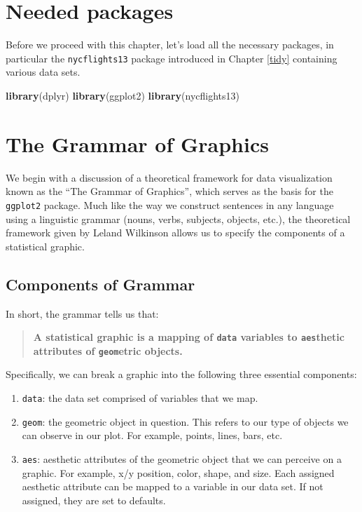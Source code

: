 \documentclass[]{tufte-book}
\newenvironment{Shaded}{\begin{snugshade}}{\end{snugshade}}
\newcommand{\KeywordTok}[1]{\textcolor[rgb]{0.13,0.29,0.53}{\textbf{{#1}}}}
\newcommand{\NormalTok}[1]{{#1}}
\providecommand{\tightlist}{%
  \setlength{\itemsep}{0pt}\setlength{\parskip}{0pt}}
\begin{document}
\section*{Needed packages}\label{needed-packages}

Before we proceed with this chapter, let's load all the necessary
packages, in particular the \texttt{nycflights13} package introduced in
Chapter \ref{tidy} containing various data sets.

\begin{Shaded}
\begin{Highlighting}[]
\KeywordTok{library}\NormalTok{(dplyr)}
\KeywordTok{library}\NormalTok{(ggplot2)}
\KeywordTok{library}\NormalTok{(nycflights13)}
\end{Highlighting}
\end{Shaded}

\section{The Grammar of Graphics}\label{grammarofgraphics}

We begin with a discussion of a theoretical framework for data
visualization known as the ``The Grammar of Graphics'', which serves as
the basis for the \texttt{ggplot2} package. Much like the way we
construct sentences in any language using a linguistic grammar (nouns,
verbs, subjects, objects, etc.), the theoretical framework given by
Leland Wilkinson \citep{wilkinson2005} allows us to specify the
components of a statistical graphic.

\subsection{Components of Grammar}\label{components-of-grammar}

In short, the grammar tells us that:

\begin{quote}
\textbf{A statistical graphic is a mapping of \texttt{data} variables to
\texttt{aes}thetic attributes of \texttt{geom}etric objects.}
\end{quote}

Specifically, we can break a graphic into the following three essential
components:

\begin{enumerate}
\def\labelenumi{\arabic{enumi}.}
\tightlist
\item
  \texttt{data}: the data set comprised of variables that we map.
\item
  \texttt{geom}: the geometric object in question. This refers to our
  type of objects we can observe in our plot. For example, points,
  lines, bars, etc.
\item
  \texttt{aes}: aesthetic attributes of the geometric object that we can
  perceive on a graphic. For example, x/y position, color, shape, and
  size. Each assigned aesthetic attribute can be mapped to a variable in
  our data set. If not assigned, they are set to defaults.
\end{enumerate}
\end{document}
